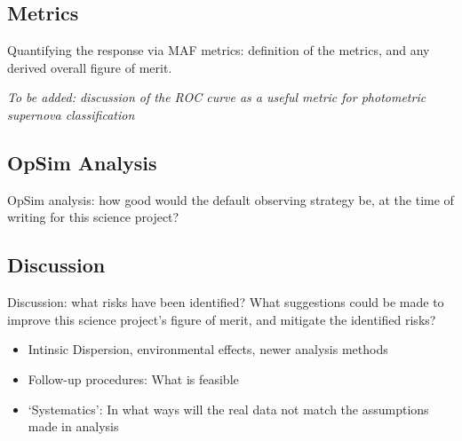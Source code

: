





\subsection{Metrics}
\label{sec:keyword:metrics}

Quantifying the response via MAF metrics: definition of the metrics,
and any derived overall figure of merit.

\emph{To be added: discussion of the ROC curve as a useful metric for photometric supernova 
classification}


\subsection{OpSim Analysis}
\label{sec:keyword:analysis}

OpSim analysis: how good would the default observing strategy be, at
the time of writing for this science project?



\subsection{Discussion}
\label{sec:keyword:discussion}

Discussion: what risks have been identified? What suggestions could be
made to improve this science project's figure of merit, and mitigate
the identified risks?


\begin{itemize}
\item Intinsic Dispersion, environmental effects, newer analysis methods
\item Follow-up procedures: What is feasible
\item `Systematics': In what ways will the real data not match the assumptions made in analysis
\end{itemize}



\navigationbar
